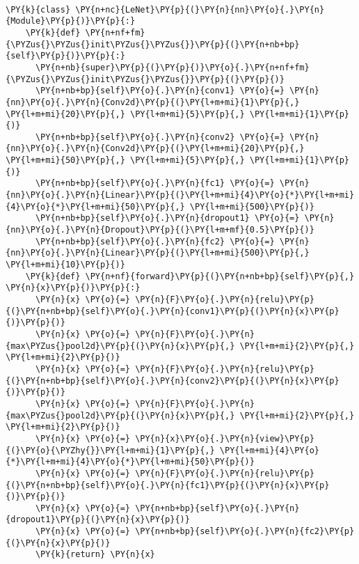     \begin{center}
    \end{center}
    { \hspace*{\fill} \\}
    
    \begin{tcolorbox}[breakable, size=fbox, boxrule=1pt, pad at break*=1mm,colback=cellbackground, colframe=cellborder]
\begin{Verbatim}[commandchars=\\\{\}]
\PY{k}{class} \PY{n+nc}{LeNet}\PY{p}{(}\PY{n}{nn}\PY{o}{.}\PY{n}{Module}\PY{p}{)}\PY{p}{:}
    \PY{k}{def} \PY{n+nf+fm}{\PYZus{}\PYZus{}init\PYZus{}\PYZus{}}\PY{p}{(}\PY{n+nb+bp}{self}\PY{p}{)}\PY{p}{:}
      \PY{n+nb}{super}\PY{p}{(}\PY{p}{)}\PY{o}{.}\PY{n+nf+fm}{\PYZus{}\PYZus{}init\PYZus{}\PYZus{}}\PY{p}{(}\PY{p}{)}
      \PY{n+nb+bp}{self}\PY{o}{.}\PY{n}{conv1} \PY{o}{=} \PY{n}{nn}\PY{o}{.}\PY{n}{Conv2d}\PY{p}{(}\PY{l+m+mi}{1}\PY{p}{,} \PY{l+m+mi}{20}\PY{p}{,} \PY{l+m+mi}{5}\PY{p}{,} \PY{l+m+mi}{1}\PY{p}{)}
      \PY{n+nb+bp}{self}\PY{o}{.}\PY{n}{conv2} \PY{o}{=} \PY{n}{nn}\PY{o}{.}\PY{n}{Conv2d}\PY{p}{(}\PY{l+m+mi}{20}\PY{p}{,} \PY{l+m+mi}{50}\PY{p}{,} \PY{l+m+mi}{5}\PY{p}{,} \PY{l+m+mi}{1}\PY{p}{)}
      \PY{n+nb+bp}{self}\PY{o}{.}\PY{n}{fc1} \PY{o}{=} \PY{n}{nn}\PY{o}{.}\PY{n}{Linear}\PY{p}{(}\PY{l+m+mi}{4}\PY{o}{*}\PY{l+m+mi}{4}\PY{o}{*}\PY{l+m+mi}{50}\PY{p}{,} \PY{l+m+mi}{500}\PY{p}{)}
      \PY{n+nb+bp}{self}\PY{o}{.}\PY{n}{dropout1} \PY{o}{=} \PY{n}{nn}\PY{o}{.}\PY{n}{Dropout}\PY{p}{(}\PY{l+m+mf}{0.5}\PY{p}{)}
      \PY{n+nb+bp}{self}\PY{o}{.}\PY{n}{fc2} \PY{o}{=} \PY{n}{nn}\PY{o}{.}\PY{n}{Linear}\PY{p}{(}\PY{l+m+mi}{500}\PY{p}{,} \PY{l+m+mi}{10}\PY{p}{)}
    \PY{k}{def} \PY{n+nf}{forward}\PY{p}{(}\PY{n+nb+bp}{self}\PY{p}{,} \PY{n}{x}\PY{p}{)}\PY{p}{:}
      \PY{n}{x} \PY{o}{=} \PY{n}{F}\PY{o}{.}\PY{n}{relu}\PY{p}{(}\PY{n+nb+bp}{self}\PY{o}{.}\PY{n}{conv1}\PY{p}{(}\PY{n}{x}\PY{p}{)}\PY{p}{)}
      \PY{n}{x} \PY{o}{=} \PY{n}{F}\PY{o}{.}\PY{n}{max\PYZus{}pool2d}\PY{p}{(}\PY{n}{x}\PY{p}{,} \PY{l+m+mi}{2}\PY{p}{,} \PY{l+m+mi}{2}\PY{p}{)}
      \PY{n}{x} \PY{o}{=} \PY{n}{F}\PY{o}{.}\PY{n}{relu}\PY{p}{(}\PY{n+nb+bp}{self}\PY{o}{.}\PY{n}{conv2}\PY{p}{(}\PY{n}{x}\PY{p}{)}\PY{p}{)}
      \PY{n}{x} \PY{o}{=} \PY{n}{F}\PY{o}{.}\PY{n}{max\PYZus{}pool2d}\PY{p}{(}\PY{n}{x}\PY{p}{,} \PY{l+m+mi}{2}\PY{p}{,} \PY{l+m+mi}{2}\PY{p}{)}
      \PY{n}{x} \PY{o}{=} \PY{n}{x}\PY{o}{.}\PY{n}{view}\PY{p}{(}\PY{o}{\PYZhy{}}\PY{l+m+mi}{1}\PY{p}{,} \PY{l+m+mi}{4}\PY{o}{*}\PY{l+m+mi}{4}\PY{o}{*}\PY{l+m+mi}{50}\PY{p}{)}
      \PY{n}{x} \PY{o}{=} \PY{n}{F}\PY{o}{.}\PY{n}{relu}\PY{p}{(}\PY{n+nb+bp}{self}\PY{o}{.}\PY{n}{fc1}\PY{p}{(}\PY{n}{x}\PY{p}{)}\PY{p}{)}
      \PY{n}{x} \PY{o}{=} \PY{n+nb+bp}{self}\PY{o}{.}\PY{n}{dropout1}\PY{p}{(}\PY{n}{x}\PY{p}{)}
      \PY{n}{x} \PY{o}{=} \PY{n+nb+bp}{self}\PY{o}{.}\PY{n}{fc2}\PY{p}{(}\PY{n}{x}\PY{p}{)}
      \PY{k}{return} \PY{n}{x}
\end{Verbatim}
\end{tcolorbox}

